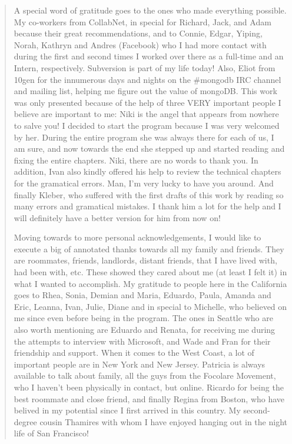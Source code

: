 \documentclass[12pt,oneside]{sfsuthesis}
\theoremstyle{plain} %
\theoremstyle{definition}  %
\theoremstyle{remark}  %
\begin{document}
\begin{quote}
A special word of gratitude goes to the ones who made everything possible.
My co-workers from CollabNet, in special for Richard, Jack, and Adam because
their great recommendations, and to Connie, Edgar, Yiping, Norah, Kathryn and
Andres (Facebook) who I had more contact with during the first and second
times I worked over there as a full-time and an Intern, respectively.
Subversion is part of my life today! Also, Eliot from 10gen for the
innumerous days and nights on the #mongodb IRC channel and mailing list,
helping me figure out the value of mongoDB. This work was only presented
because of the help of three VERY important people I believe are important to
me: Niki is the angel that appears from nowhere to salve you! I decided to
start the program because I was very welcomed by her. During the entire
program she was always there for each of us, I am sure, and now towards the
end she stepped up and started reading and fixing the entire chapters. Niki,
there are no words to thank you. In addition, Ivan also kindly offered his
help to review the technical chapters for the gramatical errors. Man, I'm very
lucky to have you around. And finally Kleber, who suffered with the first
drafts of this work by reading so many errors and gramatical mistakes. I thank
him a lot for the help and I will definitely have a better version for him from
now on!

Moving towards to more personal acknowledgements, I would like to execute a big
of annotated thanks towards all my family and friends. They are roommates,
friends, landlords, distant friends, that I have lived with, had been with,
etc. These showed they cared about me (at least I felt it) in
what I wanted to accomplish. My gratitude to people here in the California
goes to Rhea, Sonia, Demian and Maria, Eduardo, Paula, Amanda and Eric,
Leanna, Ivan, Julie, Diane and in special to Michelle, who believed on me
since even before being in the program. The ones in Seattle who are also worth
mentioning are Eduardo and Renata, for receiving me during the attempts to
interview with Microsoft, and Wade and Fran for their friendship and support.
When it comes to the West Coast, a lot of important people are in New York and New
Jersey. Patricia is always available to talk about family, all the guys from
the Focolare Movement, who I haven't been physically in contact, but online.
Ricardo for being the best roommate and close friend, and finally Regina from
Boston, who have belived in my potential since I first arrived in this
country. My second-degree cousin Thamires with whom I have enjoyed hanging out
in the night life of San Francisco!


\end{quote}
\end{document}
